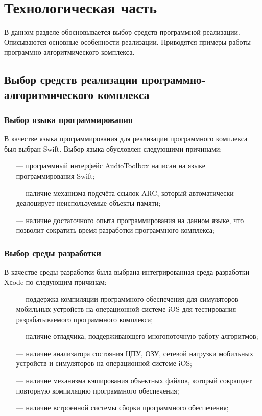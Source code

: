 \section{Технологическая часть}
    \par В данном разделе обосновывается выбор средств программной реализации. 
    Описываются основные особенности реализации. 
    Приводятся примеры работы программно-алгоритмического комплекса.

    \subsection{Выбор средств реализации программно-алгоритмического комплекса}
    \subsubsection{Выбор языка программирования}
        \par В качестве языка программирования для реализации программного комплекса был выбран Swift. 
        Выбор языка обусловлен следующими причинами:
        \begin{itemize}
            \item[---] программный интерфейс AudioToolbox написан на языке программирования Swift;
            \item[---] наличие механизма подсчёта ссылок ARC, который автоматически деалоцирует неиспользуемые объекты памяти;   
            \item[---] наличие достаточного опыта программирования на данном языке, что позволит сократить время разработки программного комплекса;
        \end{itemize}

    \subsubsection{Выбор среды разработки}
        \par В качестве среды разработки была выбрана интегрированная среда разработки Xсode \cite{xcode} по следующим причинам:
        \begin{itemize}
            \item[---] поддержка компиляции программного обеспечения для симуляторов мобильных устройств на операционной системе iOS 
            для тестирования разрабатываемого программного комплекса;
            \item[---] наличие отладчика, поддерживающего многопоточную работу алгоритмов;   
            \item[---] наличие анализатора состояния ЦПУ, ОЗУ, сетевой нагрузки мобильных устройств и симуляторов на операционной системе iOS;
            \item[---] наличие механизма кэширования объектных файлов, который сокращает повторную компиляцию программного обеспечения;
            \item[---] наличие встроенной системы сборки программного обеспечения; 
        \end{itemize}

